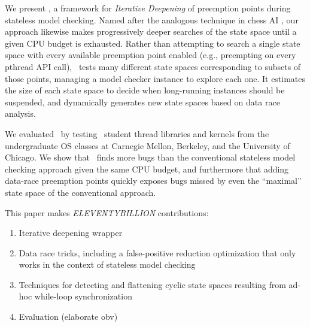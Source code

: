 We present \quicksand, a framework for {\em Iterative Deepening} of preemption points during stateless model checking.
Named after the analogous technique in chess AI \cite{iterative-deepening-chess}, our approach likewise makes progressively deeper searches of the state space until a given CPU budget is exhausted.
Rather than attempting to search a single state space with every available preemption point enabled (e.g., preempting on every pthread API call),
\quicksand~tests many different state spaces corresponding to subsets of those points, managing a model checker instance to explore each one.
It estimates the size of each state space to decide when long-running instances should be suspended, and dynamically generates new state spaces based on data race analysis.

We evaluated \quicksand~by testing \numstudence~student thread libraries and kernels from the undergraduate OS classes at Carnegie Mellon, Berkeley, and the University of Chicago.
We show that \quicksand~finds more bugs than the conventional stateless model checking approach given the same CPU budget,
and furthermore that adding data-race preemption points quickly exposes bugs missed by even the ``maximal'' state space of the conventional approach.

This paper makes {\Large \em ELEVENTYBILLION} contributions:
\begin{enumerate}
	\item Iterative deepening wrapper
	\item Data race tricks, including a false-positive reduction optimization that only works in the context of stateless model checking
	\item Techniques for detecting and flattening cyclic state spaces resulting from ad-hoc while-loop synchronization %
	\item Evaluation (elaborate obv)
\end{enumerate}
